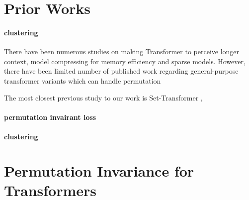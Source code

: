 \documentclass{article}
\begin{document}
\section{Prior Works}

\paragraph{clustering}
There have been numerous studies on making Transformer to perceive longer context, model compressing for memory efficiency and sparse models. However, there have been limited number of published work regarding general-purpose transformer variants which can handle permutation

The most closest previous study to our work is Set-Transformer \cite{lee2019set},
\paragraph{permutation invairant loss}

\paragraph{clustering}


\section{Permutation Invariance for Transformers}



\end{document}
